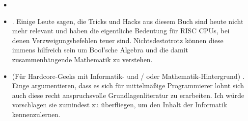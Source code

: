 \begin{itemize}

	\item \RobPikePractice
	
	\item \HenryWarren.
	Einige Leute sagen, die Tricks und Hacks aus diesem Buch sind heute nicht mehr relevant und haben die eigentliche Bedeutung für \ac{RISC} \ac{CPU}s, bei denen Verzweigungsbefehlen teuer sind.
	Nichtsdestotrotz können diese immens hilfreich sein um Bool'sche Algebra und die damit zusammenhängende Mathematik zu verstehen.
	
	\item (Für Hardcore-Geeks mit Informatik- und / oder Mathematik-Hintergrund) \TAOCP.
	Einge argumentieren, dass es sich für mittelmäßige Programmierer lohnt sich auch diese recht anspruchsvolle Grundlagenliteratur zu erarbeiten.
	Ich würde vorschlagen sie zumindest zu überfliegen, um den Inhalt der Informatik kennenzulernen.
	
\end{itemize}


